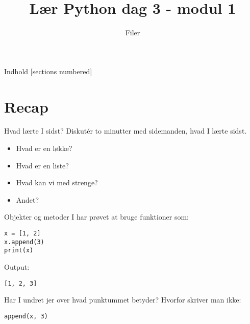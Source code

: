 

\title{Lær Python dag 3 - modul 1}
\subtitle{Filer}



\maketitle

\begin{frame}{Indhold}
  [sections numbered]
  \tableofcontents[hideallsubsections]
\end{frame}

\section{Recap}
\begin{frame}[fragile]{Hvad lærte I sidst?}
	Diskutér to minutter med sidemanden, hvad I lærte sidst.
	
	\begin{itemize}
		\item Hvad er en løkke?
		\item Hvad er en liste?
		\item Hvad kan vi med strenge?
		\item Andet?
	\end{itemize}
\end{frame}


\begin{frame}[fragile]{Objekter og metoder}
	I har prøvet at bruge funktioner som:
	
	\begin{lstlisting}[style=python]
x = [1, 2]
x.append(3)
print(x)
	\end{lstlisting}
	
	\pause
	
	Output:
	\begin{lstlisting}[style=python]
[1, 2, 3]
	\end{lstlisting}
	
	\pause
	
	Har I undret jer over hvad punktummet betyder? \pause Hvorfor skriver man ikke:
	\begin{lstlisting}[style=python]
append(x, 3)
	\end{lstlisting}
	
\end{frame}


